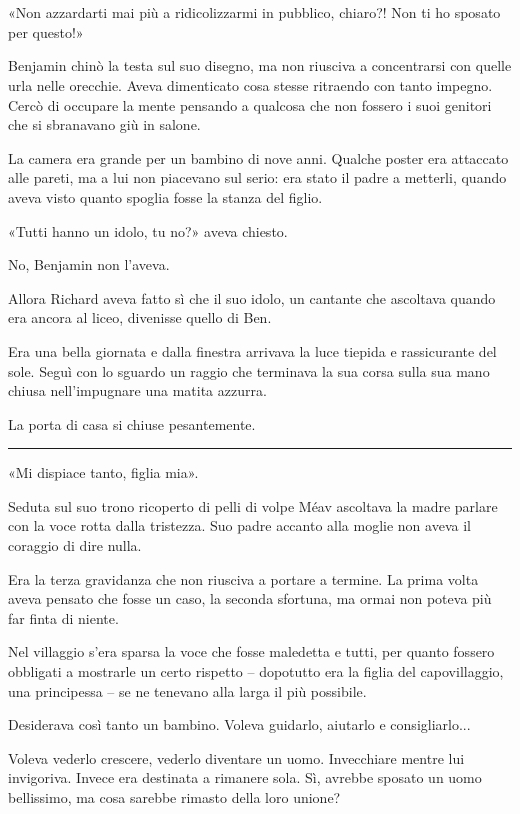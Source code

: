 \chapter{}
\label{ch:1}

«Non azzardarti mai più a ridicolizzarmi in pubblico, chiaro?! Non ti ho sposato per questo!»

Benjamin chinò la testa sul suo disegno, ma non riusciva a concentrarsi con quelle urla nelle
orecchie. Aveva dimenticato cosa stesse ritraendo con tanto impegno. Cercò di occupare la mente
pensando a qualcosa che non fossero i suoi genitori che si sbranavano giù in salone.

La camera era grande per un bambino di nove anni. Qualche poster era attaccato alle pareti, ma a lui
non piacevano sul serio: era stato il padre a metterli, quando aveva visto quanto spoglia fosse la
stanza del figlio.

«Tutti hanno un idolo, tu no?» aveva chiesto.

No, Benjamin non l’aveva.

Allora Richard aveva fatto sì che il suo idolo, un cantante che ascoltava quando era ancora al
liceo, divenisse quello di Ben.

Era una bella giornata e dalla finestra arrivava la luce tiepida e rassicurante del sole. Seguì con
lo sguardo un raggio che terminava la sua corsa sulla sua mano chiusa nell’impugnare una matita
azzurra.

La porta di casa si chiuse pesantemente.

\plainbreak{1}

«Mi dispiace tanto, figlia mia».

Seduta sul suo trono ricoperto di pelli di volpe Méav ascoltava la madre parlare con la voce rotta
dalla tristezza. Suo padre accanto alla moglie non aveva il coraggio di dire nulla.

Era la terza gravidanza che non riusciva a portare a termine. La prima volta aveva pensato che fosse
un caso, la seconda sfortuna, ma ormai non poteva più far finta di niente.

Nel villaggio s'era sparsa la voce che fosse maledetta e tutti, per quanto fossero obbligati a
mostrarle un certo rispetto -- dopotutto era la figlia del capovillaggio, una principessa -- se ne
tenevano alla larga il più possibile.

Desiderava così tanto un bambino. Voleva guidarlo, aiutarlo e consigliarlo...

Voleva vederlo crescere, vederlo diventare un uomo. Invecchiare mentre lui invigoriva. Invece era
destinata a rimanere sola. Sì, avrebbe sposato un uomo bellissimo, ma cosa sarebbe rimasto della
loro unione?

